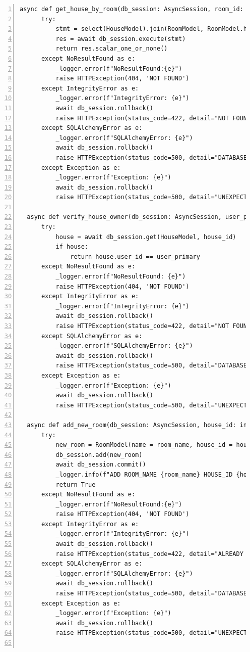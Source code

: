 \documentclass[12pt, letterpaper]{article}
\begin{document}
\begin{lstlisting}[frame=single, style=py, numbers=left, label={lst:dbqueries}, caption={db: queries.py}]
  async def get_house_by_room(db_session: AsyncSession, room_id: int):
      try:
          stmt = select(HouseModel).join(RoomModel, RoomModel.house_id == HouseModel.primary_key).where(RoomModel.primary_key == room_id)
          res = await db_session.execute(stmt)
          return res.scalar_one_or_none()
      except NoResultFound as e:
          _logger.error(f"NoResultFound:{e}")
          raise HTTPException(404, 'NOT FOUND')
      except IntegrityError as e:
          _logger.error(f"IntegrityError: {e}")
          await db_session.rollback()
          raise HTTPException(status_code=422, detail="NOT FOUND")
      except SQLAlchemyError as e:
          _logger.error(f"SQLAlchemyError: {e}")
          await db_session.rollback()
          raise HTTPException(status_code=500, detail="DATABASE ERROR")
      except Exception as e:
          _logger.error(f"Exception: {e}")
          await db_session.rollback()
          raise HTTPException(status_code=500, detail="UNEXPECTED DATABASE ERROR")
      
  async def verify_house_owner(db_session: AsyncSession, user_primary: int, house_id: int):
      try:
          house = await db_session.get(HouseModel, house_id)
          if house:
              return house.user_id == user_primary
      except NoResultFound as e:
          _logger.error(f"NoResultFound: {e}")
          raise HTTPException(404, 'NOT FOUND')
      except IntegrityError as e:
          _logger.error(f"IntegrityError: {e}")
          await db_session.rollback()
          raise HTTPException(status_code=422, detail="NOT FOUND")
      except SQLAlchemyError as e:
          _logger.error(f"SQLAlchemyError: {e}")
          await db_session.rollback()
          raise HTTPException(status_code=500, detail="DATABASE ERROR")
      except Exception as e:
          _logger.error(f"Exception: {e}")
          await db_session.rollback()
          raise HTTPException(status_code=500, detail="UNEXPECTED DATABASE ERROR")
  
  async def add_new_room(db_session: AsyncSession, house_id: int, room_name: str):
      try:
          new_room = RoomModel(name = room_name, house_id = house_id)
          db_session.add(new_room)
          await db_session.commit()
          _logger.info(f"ADD ROOM_NAME {room_name} HOUSE_ID {house_id}")
          return True
      except NoResultFound as e:
          _logger.error(f"NoResultFound:{e}")
          raise HTTPException(404, 'NOT FOUND')
      except IntegrityError as e:
          _logger.error(f"IntegrityError: {e}")
          await db_session.rollback()
          raise HTTPException(status_code=422, detail="ALREADY EXISTS")
      except SQLAlchemyError as e:
          _logger.error(f"SQLAlchemyError: {e}")
          await db_session.rollback()
          raise HTTPException(status_code=500, detail="DATABASE ERROR")
      except Exception as e:
          _logger.error(f"Exception: {e}")
          await db_session.rollback()
          raise HTTPException(status_code=500, detail="UNEXPECTED DATABASE ERROR")
  

\end{lstlisting}
\end{document}
